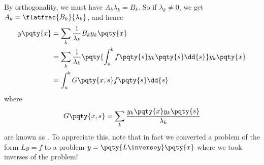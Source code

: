 By orthogonality, we must have \(A_k \lambda_k = B_k\). So if \(\lambda_k \neq 0\), we get \(A_k = \flatfrac{B_k}{\lambda_k}\), and hence
\begin{subequations}
    \begin{align}
        y\pqty{x} &= \sum_{k} \frac{1}{\lambda_k} B_k y_k \pqty{x} \\
        &= \sum_k \frac{1}{\lambda_k} \pqty{\int_a^b f\pqty{s} y_k \pqty{s} \dd{s}} y_k \pqty{x} \\
        &= \int_a^b G\pqty{x, s} f\pqty{s} \dd{s}
    \end{align}
\end{subequations}
where
\begin{equation}
    G\pqty{x, s} = \sum_k \frac{y_k \pqty{x} y_k\pqty{s}}{\lambda_k}
\end{equation}
are known as . To appreciate this, note that in fact we converted a problem of the form \(L y = f\) to a problem \(y = \pqty{L\inverse y} \pqty{x}\) where we took inverses of the problem!